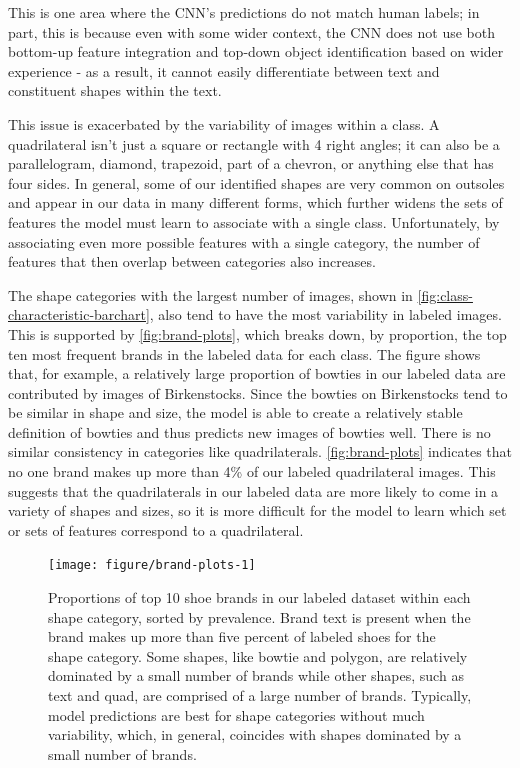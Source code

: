 \documentclass{article}\usepackage[]{graphicx}\usepackage[table]{xcolor}
\newenvironment{knitrout}{}{} %
\begin{document}
This is one area where the CNN's predictions do not match human labels; in part, this is because even with some wider context, the CNN does not use both bottom-up feature integration and top-down object identification based on wider experience - as a result, it cannot easily differentiate between text and constituent shapes within the text.

This issue is exacerbated by the variability of images within a class. A quadrilateral isn't just a square or rectangle with 4 right angles; it can also be a parallelogram, diamond, trapezoid, part of a chevron, or anything else that has four sides. In general, some of our identified shapes are very common on outsoles and appear in our data in many different forms, which further widens the sets of features the model must learn to associate with a single class. Unfortunately, by associating even more possible features with a single category, the number of features that then overlap between categories also increases.

The shape categories with the largest number of images, shown in \autoref{fig:class-characteristic-barchart}, also tend to have the most variability in labeled images. This is supported by \autoref{fig:brand-plots}, which breaks down, by proportion, the top ten most frequent brands in the labeled data for each class. The figure shows that, for example, a relatively large proportion of bowties in our labeled data are contributed by images of Birkenstocks. Since the bowties on Birkenstocks tend to be similar in shape and size, the model is able to create a relatively stable definition of bowties and thus predicts new images of bowties well. There is no similar consistency in categories like quadrilaterals. \autoref{fig:brand-plots} indicates that no one brand makes up more than 4\% of our labeled quadrilateral images. This suggests that the quadrilaterals in our labeled data are more likely to come in a variety of shapes and sizes, so it is more difficult for the model to learn which set or sets of features correspond to a quadrilateral.

\begin{knitrout}
\color{fgcolor}\begin{figure}

{\centering \texttt{[image: figure/brand-plots-1]} 

}

\caption[Proportions of top 10 shoe brands in our labeled dataset within each shape category, sorted by prevalence]{Proportions of top 10 shoe brands in our labeled dataset within each shape category, sorted by prevalence. Brand text is present when the brand makes up more than five percent of labeled shoes for the shape category. Some shapes, like bowtie and polygon, are relatively dominated by a small number of brands while other shapes, such as text and quad, are comprised of a large number of brands. Typically, model predictions are best for shape categories without much variability, which, in general, coincides with shapes dominated by a small number of brands.}\label{fig:brand-plots}
\end{figure}


\end{knitrout}
\end{document}
